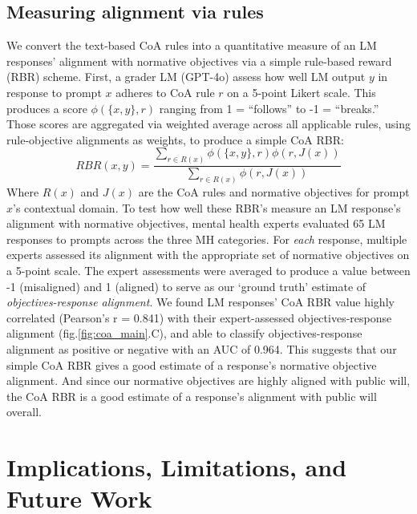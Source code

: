 \documentclass{article}
\begin{document}
\subsection{Measuring alignment via rules}
We convert the text-based CoA rules into a quantitative measure of an LM responses' alignment with normative objectives via a simple rule-based reward (RBR) scheme. First, a grader LM (GPT-4o) assess how well LM output $y$ in response to prompt $x$ adheres to CoA rule $r$ on a 5-point Likert scale. This produces a score $\phi(\{x,y\},r)$ ranging from 1 = ``follows'' to -1 = ``breaks.'' Those scores are aggregated via weighted average across all applicable rules, using rule-objective alignments as weights, to produce a simple CoA RBR: 
\begin{equation}
    RBR(x,y) = \frac{\sum\limits_{r\in R(x)} \phi(\{x,y\},r) \phi(r,J(x))}{\sum\limits_{r\in R(x)} \phi(r,J(x))}
\end{equation}
Where $R(x)$ and $J(x)$ are the CoA rules and normative objectives for prompt $x$'s contextual domain. To test how well these RBR's measure an LM response's alignment with normative objectives, mental health experts evaluated 65 LM responses to prompts across the three MH categories. For \emph{each} response, multiple experts assessed its alignment with the appropriate set of normative objectives on a 5-point scale. The expert assessments were averaged to produce a value between -1 (misaligned) and 1 (aligned) to serve as our ‘ground truth’ estimate of \emph{objectives-response alignment}. We found LM responses' CoA RBR value highly correlated (Pearson’s r = 0.841) with their expert-assessed objectives-response alignment (fig.\ref{fig:coa_main}.C), and able to classify objectives-response alignment as positive or negative with an AUC of 0.964. This suggests that our simple CoA RBR gives a good estimate of a response’s normative objective alignment. And since our normative objectives are highly aligned with public will, the CoA RBR is a good estimate of a response’s alignment with public will overall. 


\section{Implications, Limitations, and Future Work}
\end{document}
